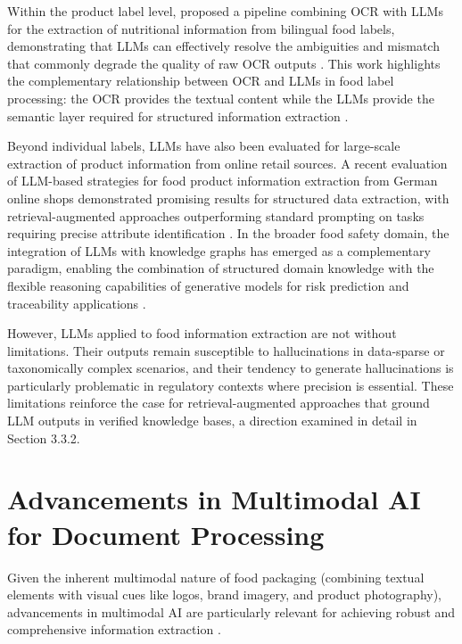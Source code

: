 Within the product label level, \textcite{fatmah_yousef_assiri_d1ac72fc} proposed a pipeline combining OCR with LLMs for the extraction of nutritional information from bilingual food labels, demonstrating that LLMs can effectively resolve the ambiguities and mismatch that commonly degrade the quality of raw OCR outputs \parencite{fatmah_yousef_assiri_d1ac72fc}. This work highlights the complementary relationship between OCR and LLMs in food label processing: the OCR provides the textual content while the LLMs provide the semantic layer required for structured information extraction \parencite{fatmah_yousef_assiri_d1ac72fc}.

Beyond individual labels, LLMs have also been evaluated for large-scale extraction of product information from online retail sources. A recent evaluation of LLM-based strategies for food product information extraction from German online shops demonstrated promising results for structured data extraction, with retrieval-augmented approaches outperforming standard prompting on tasks requiring precise attribute identification \parencite{brosch__christoph_34010501}. In the broader food safety domain, the integration of LLMs with knowledge graphs has emerged as a complementary paradigm, enabling the combination of structured domain knowledge with the flexible reasoning capabilities of generative models for risk prediction and traceability applications \parencite{mohbat_tharani_f8ffae09}.

However, LLMs applied to food information extraction are not without limitations. Their outputs remain susceptible to hallucinations in data-sparse or taxonomically complex scenarios, and their tendency to generate hallucinations is particularly problematic in regulatory contexts where precision is essential. These limitations reinforce the case for retrieval-augmented approaches that ground LLM outputs in verified knowledge bases, a direction examined in detail in Section 3.3.2.

\hypertarget{advancements-in-multimodal-ai-for-document-processing}{%
\section{Advancements in Multimodal AI for Document Processing}\label{advancements-in-multimodal-ai-for-document-processing}}

Given the inherent multimodal nature of food packaging (combining textual elements with visual cues like logos, brand imagery, and product photography), advancements in multimodal AI are particularly relevant for achieving robust and comprehensive information extraction \parencite{qingfeng_tian_6cb227c3,cheng_dong_zhang_6ced93cf}.

